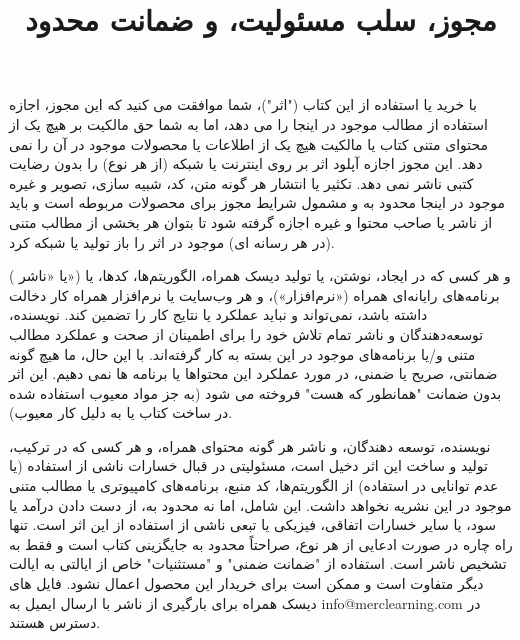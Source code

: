 \title{
    \center \Huge
    مجوز، سلب مسئولیت، و ضمانت محدود \\[25pt]
}
{ \large
{
    با خرید یا استفاده از این کتاب ("اثر")، شما موافقت می کنید که این مجوز، اجازه استفاده از مطالب موجود در اینجا را می دهد، اما به شما حق مالکیت بر هیچ یک از محتوای متنی کتاب یا مالکیت هیچ یک از اطلاعات یا محصولات موجود در آن را نمی دهد.
این مجوز اجازه آپلود اثر بر روی اینترنت یا شبکه (از هر نوع) را بدون رضایت کتبی ناشر نمی دهد.
تکثیر یا انتشار هر گونه متن، کد، شبیه سازی، تصویر و غیره موجود در اینجا محدود به و مشمول شرایط مجوز برای محصولات مربوطه است و باید از ناشر یا صاحب محتوا و غیره اجازه گرفته شود تا بتوان هر بخشی از مطالب متنی (در هر رسانه ای) موجود در اثر را باز تولید یا شبکه کرد.
}

{
     ( یا «ناشر») و هر کسی که در ایجاد، نوشتن، یا تولید دیسک همراه، الگوریتم‌ها، کدها، یا برنامه‌های رایانه‌ای همراه («نرم‌افزار»)، و هر وب‌سایت یا نرم‌افزار همراه کار دخالت داشته باشد، نمی‌تواند و نباید عملکرد یا نتایج کار را تضمین کند.
نویسنده، توسعه‌دهندگان و ناشر تمام تلاش خود را برای اطمینان از صحت و عملکرد مطالب متنی و/یا برنامه‌های موجود در این بسته به کار گرفته‌اند.
با این حال، ما هیچ گونه ضمانتی، صریح یا ضمنی، در مورد عملکرد این محتواها یا برنامه ها نمی دهیم.
این اثر بدون ضمانت "همانطور که هست" فروخته می شود (به جز مواد معیوب استفاده شده در ساخت کتاب یا به دلیل کار معیوب).
}

{
    نویسنده، توسعه دهندگان، و ناشر هر گونه محتوای همراه، و هر کسی که در ترکیب، تولید و ساخت این اثر دخیل است، مسئولیتی در قبال خسارات ناشی از استفاده (یا عدم توانایی در استفاده) از الگوریتم‌ها، کد منبع، برنامه‌های کامپیوتری یا مطالب متنی موجود در این نشریه نخواهد داشت.
این شامل، اما نه محدود به، از دست دادن درآمد یا سود، یا سایر خسارات اتفاقی، فیزیکی یا تبعی ناشی از استفاده از این اثر است.
تنها راه چاره در صورت ادعایی از هر نوع، صراحتاً محدود به جایگزینی کتاب است و فقط به تشخیص ناشر است.
استفاده از "ضمانت ضمنی" و "مستثنیات" خاص از ایالتی به ایالت دیگر متفاوت است و ممکن است برای خریدار این محصول اعمال نشود.
فایل های دیسک همراه برای بارگیری از ناشر با ارسال ایمیل به info@merclearning.com در دسترس هستند.
}
}
\newpage
\begin{titlepage}
    \vspace*{\fill}
    \begin{center}
    {\textbf{\center \Huge \CourseName}}
    \end{center}
    \vspace*{\fill}
\end{titlepage}

